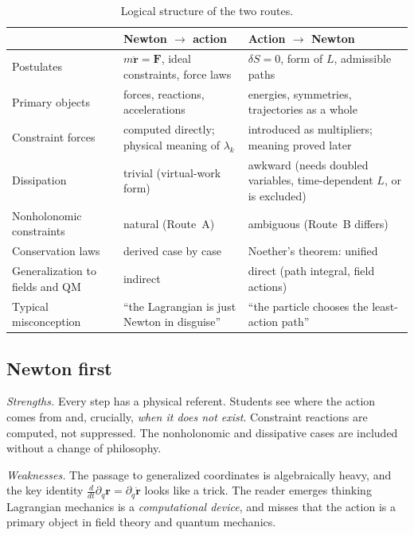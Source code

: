 \begin{table}[ht]
\centering\small
\renewcommand{\arraystretch}{1.25}
\begin{tabular}{@{}p{3.1cm}p{5.6cm}p{5.6cm}@{}}
\toprule
 & \textbf{Newton $\to$ action} & \textbf{Action $\to$ Newton}\\
\midrule
Postulates & $m\ddot{\mathbf r}=\mathbf F$, ideal constraints, force laws &
  $\delta S=0$, form of $L$, admissible paths \\
Primary objects & forces, reactions, accelerations & energies, symmetries, trajectories as a whole \\
Constraint forces & computed directly; physical meaning of $\lambda_k$ & introduced as multipliers; meaning proved later \\
Dissipation & trivial (virtual-work form) & awkward (needs doubled variables, time-dependent $L$, or is excluded) \\
Nonholonomic constraints & natural (Route~A) & ambiguous (Route~B differs) \\
Conservation laws & derived case by case & Noether's theorem: unified \\
Generalization to fields and QM & indirect & direct (path integral, field actions) \\
Typical misconception & ``the Lagrangian is just Newton in disguise'' & ``the particle chooses the least-action path'' \\
\bottomrule
\end{tabular}
\caption{Logical structure of the two routes.}
\label{tab:routes}
\end{table}

\subsection{Newton first}

\emph{Strengths.} Every step has a physical referent. Students see where
the action comes from and, crucially, \emph{when it does not exist}.
Constraint reactions are computed, not suppressed. The nonholonomic
and dissipative cases are included without a change of philosophy.

\emph{Weaknesses.} The passage to generalized coordinates is algebraically
heavy, and the key identity
$\frac{d}{dt}\partial_{q}\mathbf r=\partial_{\dot q}\dot{\mathbf r}$ looks
like a trick. The reader emerges thinking Lagrangian mechanics is a
\emph{computational device}, and misses that the action is a primary
object in field theory and quantum mechanics.

